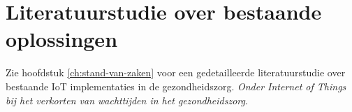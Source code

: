 






\section{Literatuurstudie over bestaande oplossingen}
Zie hoofdstuk \ref{ch:stand-van-zaken} voor een gedetailleerde literatuurstudie over bestaande IoT implementaties in de gezondheidszorg. \textit{Onder Internet of Things bij het verkorten van wachttijden in het gezondheidszorg}.

